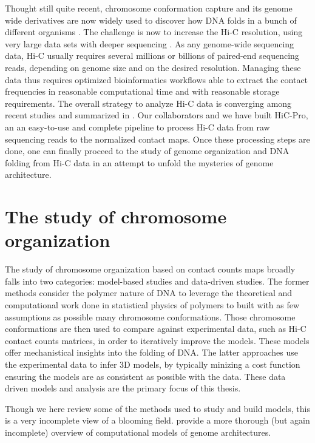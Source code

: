 Thought still quite recent, chromosome conformation capture and its genome
wide derivatives are now widely used to discover how DNA folds in a bunch of
different organisms \citep{duan:three, sexton:three-dimensional,
tanizawa:mapping, ay:three-dimensional}. The challenge is now to increase the
Hi-C resolution, using very large data sets with deeper sequencing
\citep{rao:3d, jin:high-resolution}. As any genome-wide sequencing data, Hi-C
usually requires several millions or billions of paired-end sequencing reads,
depending on genome size and on the desired resolution. Managing these data
thus requires optimized bioinformatics workflows able to extract the contact
frequencies in reasonable computational time and with reasonable storage
requirements. The overall strategy to analyze Hi-C data is converging among
recent studies and summarized in \cite{lajoie:hitchhiker}. Our collaborators
and we have built HiC-Pro, an an easy-to-use and complete pipeline to process
Hi-C data from raw sequencing reads to the normalized contact maps. Once these
processing steps are done, one can finally proceed to the study of genome
organization and DNA folding from Hi-C data in an attempt to unfold the
mysteries of genome architecture.

\section{The study of chromosome organization}

The study of chromosome organization based on contact counts maps broadly
falls into two categories: model-based studies and data-driven studies. The
former methods consider the polymer nature of DNA to leverage the theoretical
and computational work done in statistical physics of polymers to built with
as few assumptions as possible many chromosome conformations. Those chromosome
conformations are then used to compare against experimental data, such as Hi-C
contact counts matrices, in order to iteratively improve the models. These
models offer mechanistical insights into the folding of DNA. The latter
approaches use the experimental data to infer 3D models, by typically minizing
a cost function ensuring the models are as consistent as possible with the
data. These data driven models and analysis are the primary focus of this
thesis.

Though we here review some of the methods used to study and build models, this
is a very incomplete view of a blooming field. \citet{rosa:computational}
provide a more thorough (but again incomplete) overview of computational models
of genome architectures.

